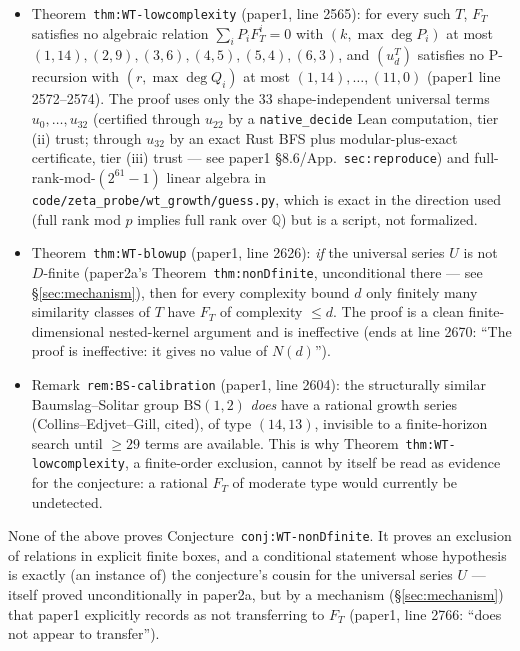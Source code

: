 \documentclass[11pt]{article}
\theoremstyle{remark}
\newcommand{\Q}{\mathbb Q}
\begin{document}
\begin{itemize}
\item[(PROVED, computer-assisted)] Theorem~\texttt{thm:WT-lowcomplexity} (paper1, line 2565): for every
such $T$, $F_T$ satisfies no algebraic relation $\sum_iP_iF_T^i=0$ with $(k,\max\deg P_i)$ at most
$(1,14),(2,9),(3,6),(4,5),(5,4),(6,3)$, and $(u_d^T)$ satisfies no P-recursion with $(r,\max\deg Q_i)$
at most $(1,14),\dots,(11,0)$ (paper1 line 2572--2574). The proof uses only the $33$ shape-independent
universal terms $u_0,\dots,u_{32}$ (certified through $u_{22}$ by a \texttt{native\_decide} Lean
computation, tier (ii) trust; through $u_{32}$ by an exact Rust BFS plus modular-plus-exact certificate,
tier (iii) trust — see paper1 \S8.6/App.~\texttt{sec:reproduce}) and full-rank-mod-$(2^{61}-1)$ linear
algebra in \texttt{code/zeta\_probe/wt\_growth/guess.py}, which is exact in the direction used (full
rank mod $p$ implies full rank over $\Q$) but is a script, not formalized.
\item[(PROVED, conditional)] Theorem~\texttt{thm:WT-blowup} (paper1, line 2626): \emph{if} the universal
series $U$ is not $D$-finite (paper2a's Theorem~\texttt{thm:nonDfinite}, unconditional there — see
\S\ref{sec:mechanism}), then for every complexity bound $d$ only finitely many similarity classes of
$T$ have $F_T$ of complexity $\le d$. The proof is a clean finite-dimensional nested-kernel argument and
is ineffective (ends at line 2670: ``The proof is ineffective: it gives no value of $N(d)$'').
\item[(explicit calibration against a false positive, PROVED)] Remark~\texttt{rem:BS-calibration}
(paper1, line 2604): the structurally similar Baumslag--Solitar group $\mathrm{BS}(1,2)$ \emph{does} have
a rational growth series (Collins--Edjvet--Gill, cited), of type $(14,13)$, invisible to a
finite-horizon search until $\ge29$ terms are available. This is why
Theorem~\texttt{thm:WT-lowcomplexity}, a finite-order exclusion, cannot by itself be read as evidence
for the conjecture: a rational $F_T$ of moderate type would currently be undetected.
\end{itemize}
None of the above proves Conjecture~\texttt{conj:WT-nonDfinite}. It proves an exclusion of relations in
explicit finite boxes, and a conditional statement whose hypothesis is exactly (an instance of) the
conjecture's cousin for the universal series $U$ — itself proved unconditionally in paper2a, but by a
mechanism (\S\ref{sec:mechanism}) that paper1 explicitly records as not transferring to $F_T$
(paper1, line 2766: ``does not appear to transfer'').
\end{document}
